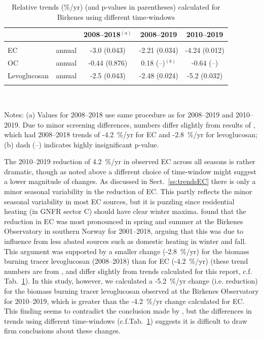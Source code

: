 \begin{table}[H]
\centering
\parbox{11.9cm}{
\caption{Relative trends (\%/yr) (and p-values in parentheses) calculated for Birkenes 
    using different time-windows \label{tab:BirkenesTrends}}}
\begin{tabular}{lcccc}
\toprule
     &         & 2008--2018$^{(a)}$& 2008--2019     & 2010--2019       \\
\midrule
 & & & & \\
EC   & annual  & -3.0 (0.043)        &  -2.21 (0.034)   & -4.24 (0.012) \\
OC   & annual  &  -0.44 (0.876)      &   0.18 (--)$^{(b)}$     & -0.64 (--)   \\
Levoglucosan & annual  & -2.5 (0.043)        &  -2.48 (0.024)   & -5.2  (0.032) \\
& & & & \\
\bottomrule 
\end{tabular}\\
\parbox{11.9cm}{

Notes:
(a) Values for 2008--2018 use same procedure as for 2008--2019 and 2010--2019.
Due to minor screening differences, numbers
differ slightly from results of \citet{Yttri2021}, which had 2008--2018 trends of -4.2~\%/yr for EC and -2.8~\%/yr for levoglucosan;
(b) dash (--) indicates highly insignificant p-value.\\
}
\end{table}


The 2010--2019 reduction of 4.2~\%/yr in observed EC across all seasons is rather dramatic, though as noted above a different choice of time-window might suggest a lower magnitude of changes. 
As discussed in Sect.~\ref{ss:trendsEC} there is only a minor seasonal variability in the reduction of EC. This partly reflects the minor seasonal variability in most EC sources, but it is puzzling since residential heating (in GNFR sector C) should have clear winter maxima. \citet{Yttri2021} found that the reduction in EC
was most pronounced in spring and summer at the Birkenes Observatory in
southern Norway for 2001--2018, arguing that this was due to influence
from less abated sources such as domestic heating in winter and fall. This argument was
supported by a smaller change (-2.8~\%/yr) for the biomass burning
tracer levoglucosan (2008--2018) than for EC (-4.2~\%/yr) (these trend numbers are from \citeauthor{Yttri2021}, and differ slightly from trends calculated for this report, c.f. Tab.~\ref{tab:BirkenesTrends}). In this study, however, 
we calculated a -5.2~\%/yr change (i.e. reduction) for the biomass burning tracer
levoglucosan observed at the Birkenes Observatory for 2010--2019, which is
greater than the -4.2~\%/yr change calculated for EC.
This finding seems to contradict the conclusion made
by \citet{Yttri2021}, but the differences in trends using different time-windows (c.f.Tab.~\ref{tab:BirkenesTrends}) suggests it is difficult to draw firm conclusions about these changes.



